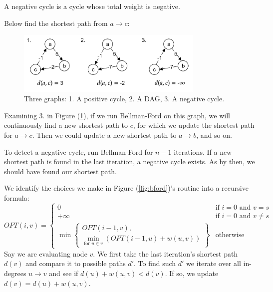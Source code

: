 \newpage

\begin{Def}

    A negative cycle is a cycle whose total weight is negative.
\end{Def}

\noindent
Below find the shortest path from $a\to c$:
\begin{figure}[h]
    \centering
    \includegraphics[width=0.8\textwidth]{Sections/dp/negcyc.png}
    \caption{Three graphs: 1. A positive cycle, 2. A DAG, 3. A negative cycle.}
    \label{fig:ncycle}
\end{figure}

\noindent
Examining 3. in Figure (\ref{fig:ncycle}), if we run Bellman-Ford on this graph, we will continuously find a new shortest path to $c$,
for which we update the shortest path for $a\to c$. Then we could update a new shortest path to $a\to b$, and so on.
\begin{theo}

    To detect a negative cycle, run Bellman-Ford for $n-1$ iterations. If a new shortest path is found in the last iteration, a negative cycle exists. As by then,
    we should have found our shortest path.
\end{theo}
\noindent
We identify the choices we make in Figure (\ref{fig:bford})'s routine into a recursive formula:
\[
OPT(i, v) = 
\begin{cases} 
0 & \text{if } i = 0 \text{ and } v = s \\ 
+\infty & \text{if } i = 0 \text{ and } v \neq s \\
\min \left\{ 
\begin{array}{l}
OPT(i - 1, v), \\
{\displaystyle \min_{\text{for } u\in v}} {\left( OPT(i - 1, u) + w(u, v) \right)}
\end{array} 
\right\} & \text{otherwise}
\end{cases}
\]
\noindent
Say we are evaluating node $v$. We first take the last iteration's shortest path $d(v)$ and compare it to possible paths $d'$. To 
find such $d'$ we iterate over all in-degrees $u\to v$ and see if $d(u)+w(u,v)<d(v)$. If so, we update $d(v)=d(u)+w(u,v)$.\\

